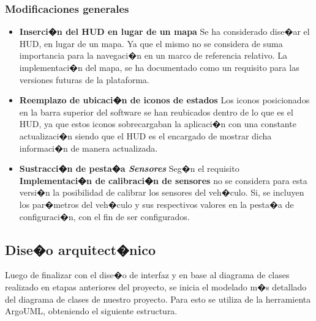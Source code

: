 \subsubsection{Modificaciones generales}
\begin{itemize}
	
	\item \textbf{Inserci�n del HUD en lugar de un mapa} Se ha considerado dise�ar el HUD, en lugar de un mapa. Ya que el mismo no se considera de suma importancia para la navegaci�n en un marco de referencia relativo. La implementaci�n del mapa, se ha documentado como un requisito para las versiones futuras de la plataforma.
	
	\item \textbf{Reemplazo de ubicaci�n de iconos de estados} Los iconos posicionados en la barra superior del software se han reubicados dentro de lo que es el HUD, ya que estos iconos sobrecargaban la aplicaci�n con una constante actualizaci�n siendo que el HUD es el encargado de mostrar dicha informaci�n de manera actualizada.
	
	\item \textbf{Sustracci�n de pesta�a \textit{Sensores}} Seg�n el requisito \textbf{Implementaci�n de calibraci�n de sensores} no se considera para esta versi�n la posibilidad de calibrar los sensores del veh�culo. Si, se incluyen los par�metros del veh�culo y sus respectivos valores en la pesta�a de configuraci�n, con el fin de ser configurados.
	
\end{itemize}



\subsection{Dise�o arquitect�nico}


Luego de finalizar con el dise�o de interfaz y en base al diagrama de clases realizado en etapas anteriores del proyecto, se inicia el modelado m�s detallado del diagrama de clases de nuestro proyecto. Para esto se utiliza de la herramienta ArgoUML, obteniendo el siguiente estructura. 

